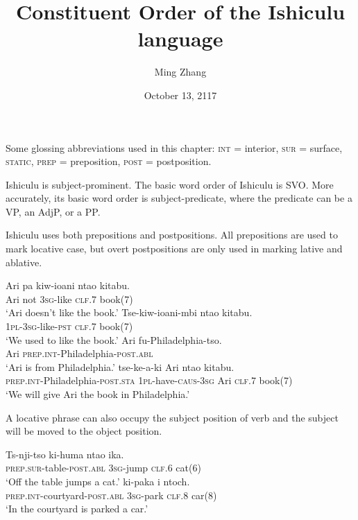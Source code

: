 \documentclass[12pt, oneside]{article}
\title{Constituent Order of the Ishiculu language}
\author{Ming Zhang}
\date{October 13, 2117}
\begin{document}
\maketitle

Some glossing abbreviations used in this chapter: \textsc{int} = interior, \textsc{sur} = surface, \textsc{static}, \textsc{prep} = preposition, \textsc{post} = postposition.

Ishiculu is subject-prominent. The basic word order of Ishiculu is SVO. More accurately, its basic word order is subject-predicate, where the predicate can be a VP, an AdjP, or a PP.

Ishiculu uses both prepositions and postpositions. All prepositions are used to mark locative case, but overt postpositions are only used in marking lative and ablative.

\begin{exe}
\ex
\gll Ari pa kiw-ioani nta\textbeltl o kitabu. \\
Ari not \textsc{3sg}-like \textsc{clf}.7 book(7) \\
\trans `Ari doesn't like the book.'
\ex
\gll Tse-kiw-ioani-mbi nta\textbeltl o kitabu. \\
\textsc{1pl}-\textsc{3sg}-like-\textsc{pst} \textsc{clf}.7 book(7) \\
\trans `We used to like the book.'
\ex
\gll Ari fu-Philadelphia-tso. \\
Ari \textsc{prep.int}-Philadelphia-\textsc{post.abl} \\
\trans `Ari is from Philadelphia.'
\ex
{} tse-ke-\textbeltl a-ki Ari nta\textbeltl o kitabu. \\
\textsc{prep.int}-Philadelphia-\textsc{post.sta} \textsc{1pl}-have-\textsc{caus}-\textsc{3sg} Ari \textsc{clf}.7 book(7) \\
\trans `We will give Ari the book in Philadelphia.'
\end{exe}

A locative phrase can also occupy the subject position of verb and the subject will be moved to the object position.

\begin{exe}
\ex
\gll Ts\textramshorns-nji-tso ki-huma nta\textbeltl o ika. \\
\textsc{prep.sur}-table-\textsc{post.abl} \textsc{3sg}-jump \textsc{clf}.6 cat(6) \\
\trans `Off the table jumps a cat.'
\ex
{} ki-paka i ntoch\textramshorns. \\
\textsc{prep.int}-courtyard-\textsc{post.abl} \textsc{3sg}-park \textsc{clf}.8 car(8) \\
\trans `In the courtyard is parked a car.'
\end{exe}
\end{document}
